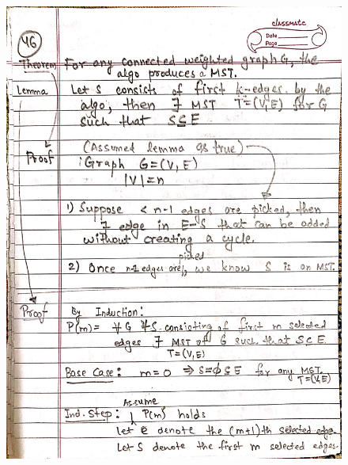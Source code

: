 \begin{figure}[H]
    \centering
    \includegraphics[scale=0.25]{"./MIT 6.042J/MIT_6042J_046"}
\end{figure}
\newpage

